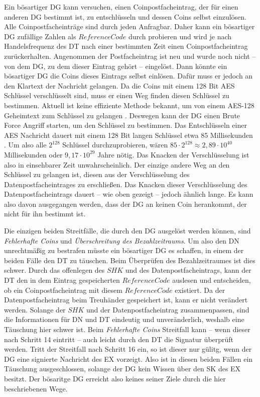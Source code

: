 \documentclass[
	fontsize=11pt,
	headings=small,
	parskip=half,           %
	bibliography=totoc,
	numbers=noenddot,       %
	open=any,               %
]{scrreprt}
\begin{document}
Ein bösartiger DG kann versuchen, einen Coinpostfacheintrag, der für einen anderen DG bestimmt ist, zu entschlüsseln und dessen Coins selbst einzulösen. Alle Coinpostfacheinträge sind durch jeden Anfragbar. Daher kann ein bösartiger DG zufällige Zahlen als $ReferenceCode$ durch probieren und wird je nach Handelsfrequenz des DT nach einer bestimmten Zeit einen Coinpostfacheintrag zurückerhalten. Angenommen der Postfacheintrag ist neu und wurde noch nicht -- von dem DG, zu dem dieser Eintrag gehört -- eingelöst. Dann könnte ein bösartiger DG die Coins dieses Eintrags selbst einlösen. Dafür muss er jedoch an den Klartext der Nachricht gelangen. Da die Coins mit einem 128 Bit AES Schlüssel verschlüsselt sind, muss er einen Weg finden diesen Schlüssel zu bestimmen. Aktuell ist keine effiziente Methode bekannt, um von einem AES-128 Geheimtext zum Schlüssel zu gelangen \cite{aes-Biryukov2010Key}. Deswegen kann der DG einen Brute Force Angriff starten, um den Schlüssel zu bestimmen. Das Entschlüsseln einer AES Nachricht dauert mit einem 128 Bit langen Schlüssel etwa 85 Millisekunden \cite{aes-Kumar2016Implementation}. Um also alle $2^{128}$ Schlüssel durchzuprobieren, wären $85\cdot 2^{128} \approx 2,89\cdot10^{40}$ Millisekunden oder $9,17\cdot10^{29}$ Jahre nötig. Das Knacken der Verschlüsselung ist also in einsehbarer Zeit unwahrscheinlich. Der einzige andere Weg an den Schlüssel zu gelangen ist, diesen aus der Verschlüsselung des Datenpostfacheintrages zu erschließen. Das Knacken dieser Verschlüsselung des Datenpostfacheintrags dauert -- wie oben gezeigt -- jedoch ähnlich lange. Es kann also davon ausgegangen werden, dass der DG an keinen Coin herankommt, der nicht für ihn bestimmt ist. 

Die einzigen beiden Streitfälle, die durch den DG ausgelöst werden können, sind \textit{Fehlerhafte Coins} und \textit{Überschreitung des Bezahlzeitraums}. Um also den DN unrechtmäßig zu bestrafen müsste ein bösartiger DG es schaffen, in einem der beiden Fälle den DT zu täuschen. Beim Überprüfen des Bezahlzeitraumes ist dies schwer. Durch das offenlegen des $SHK$ und des Datenpostfacheintrags, kann der DT den in dem Eintrag gespeicherten $ReferenceCode$ auslesen und entscheiden, ob ein Coinpostfacheintrag mit diesem $ReferenceCode$ existiert. Da der Datenpostfacheintrag beim Treuhänder gespeichert ist, kann er nicht verändert werden. Solange der $SHK$ und der Datenpostfacheintrag zusammenpassen, sind die Informationen für DN und DT eindeutig und unveränderlich, weshalb eine Täuschung hier schwer ist. Beim \textit{Fehlerhafte Coins} Streitfall kann -- wenn dieser nach Schritt 14 eintritt -- auch leicht durch den DT die Signatur überprüft werden. Tritt der Streitfall nach Schritt 16 ein, so ist dieser nur gülitg, wenn der DG eine signierte Nachricht des EX vorzeigt. Also ist in diesen beiden Fällen ein Täuschung ausgeschlossen, solange der DG kein Wissen über den SK des EX besitzt. Der bösaritge DG erreicht also keines seiner Ziele durch die hier beschriebenen Wege.
\end{document}
